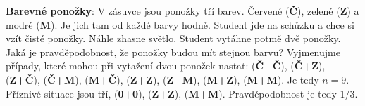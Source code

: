 \begin{example}
 \label{mai:exam006}
  \textbf{Barevné ponožky}:\newline
  V zásuvce jsou ponožky tří barev. Červené (\textbf{Č}), zelené (\textbf{Z}) a modré (\textbf{M}). 
  Je jich tam od každé barvy hodně. Student jde na schůzku a chce si vzít čisté ponožky. Náhle 
  zhasne světlo. Student vytáhne potmě dvě ponožky. Jaká je pravděpodobnost, že ponožky budou mít 
  stejnou barvu? Vyjmenujme případy, které mohou při vytažení dvou ponožek nastat: (\textbf{Č+Č}), 
  (\textbf{Č+Z}), (\textbf{Z+Č}), (\textbf{Č+M}), (\textbf{M+Č}), (\textbf{Z+Z}), (\textbf{Z+M}), 
  (\textbf{M+Z}), (\textbf{M+M}). Je tedy \(n = 9\). Příznivé situace jsou tří, (\textbf{0+0}), 
  (\textbf{Z+Z}), (\textbf{M+M}). Pravděpodobnost je tedy 1/3.  
\end{example}